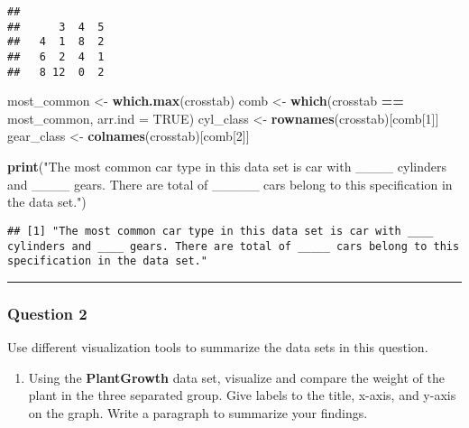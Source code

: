 \documentclass[
]{article}
\newenvironment{Shaded}{\begin{snugshade}}{\end{snugshade}}
\newcommand{\AttributeTok}[1]{\textcolor[rgb]{0.13,0.29,0.53}{#1}}
\newcommand{\ConstantTok}[1]{\textcolor[rgb]{0.56,0.35,0.01}{#1}}
\newcommand{\DecValTok}[1]{\textcolor[rgb]{0.00,0.00,0.81}{#1}}
\newcommand{\FunctionTok}[1]{\textcolor[rgb]{0.13,0.29,0.53}{\textbf{#1}}}
\newcommand{\NormalTok}[1]{#1}
\newcommand{\OtherTok}[1]{\textcolor[rgb]{0.56,0.35,0.01}{#1}}
\newcommand{\SpecialCharTok}[1]{\textcolor[rgb]{0.81,0.36,0.00}{\textbf{#1}}}
\newcommand{\StringTok}[1]{\textcolor[rgb]{0.31,0.60,0.02}{#1}}
\providecommand{\tightlist}{%
  \setlength{\itemsep}{0pt}\setlength{\parskip}{0pt}}
\begin{document}
\begin{verbatim}
##    
##      3  4  5
##   4  1  8  2
##   6  2  4  1
##   8 12  0  2
\end{verbatim}

\begin{Shaded}
\begin{Highlighting}[]
\NormalTok{most\_common }\OtherTok{\textless{}{-}} \FunctionTok{which.max}\NormalTok{(crosstab)}
\NormalTok{comb }\OtherTok{\textless{}{-}} \FunctionTok{which}\NormalTok{(crosstab }\SpecialCharTok{==}\NormalTok{ most\_common, }\AttributeTok{arr.ind =} \ConstantTok{TRUE}\NormalTok{)}
\NormalTok{cyl\_class }\OtherTok{\textless{}{-}} \FunctionTok{rownames}\NormalTok{(crosstab)[comb[}\DecValTok{1}\NormalTok{]]}
\NormalTok{gear\_class }\OtherTok{\textless{}{-}} \FunctionTok{colnames}\NormalTok{(crosstab)[comb[}\DecValTok{2}\NormalTok{]]}

\FunctionTok{print}\NormalTok{(}\StringTok{"The most common car type in this data set is car with \_\_\_\_ cylinders and \_\_\_\_ gears. There are total of \_\_\_\_\_ cars belong to this specification in the data set."}\NormalTok{)}
\end{Highlighting}
\end{Shaded}

\begin{verbatim}
## [1] "The most common car type in this data set is car with ____ cylinders and ____ gears. There are total of _____ cars belong to this specification in the data set."
\end{verbatim}

\begin{center}\rule{0.5\linewidth}{0.5pt}\end{center}

\subsubsection{Question 2}\label{question-2}

Use different visualization tools to summarize the data sets in this
question.

\begin{enumerate}
\def\labelenumi{\alph{enumi}.}
\tightlist
\item
  Using the \textbf{PlantGrowth} data set, visualize and compare the
  weight of the plant in the three separated group. Give labels to the
  title, x-axis, and y-axis on the graph. Write a paragraph to summarize
  your findings.
\end{enumerate}
\end{document}
